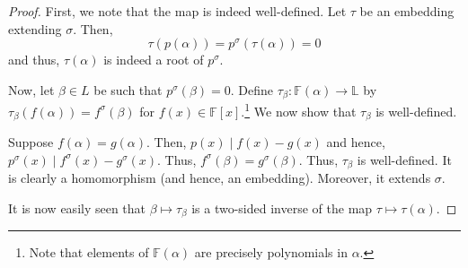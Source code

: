 \rootsandextensions*\label{prop:rootsandextensions2}
\begin{flushright}\hyperref[prop:rootsandextensions]{\upsym}\end{flushright}
\begin{proof}
    First, we note that the map is indeed well-defined. Let $\tau$ be an embedding extending $\sigma.$ Then,
    \begin{equation*} 
        \tau(p(\alpha)) = p^{\sigma}(\tau(\alpha)) = 0
    \end{equation*}
    and thus, $\tau(\alpha)$ is indeed a root of $p^{\sigma}.$ 

    Now, let $\beta \in L$ be such that $p^{\sigma}(\beta) = 0.$ Define $\tau_{\beta} : \mathbb{F}(\alpha) \to \mathbb{L}$ by $\tau_{\beta}(f(\alpha)) = f^{\sigma}(\beta)$ for $f(x) \in \mathbb{F}[x].$\footnote{Note that elements of $\mathbb{F}(\alpha)$ are precisely polynomials in $\alpha.$} We now show that $\tau_{\beta}$ is well-defined. 

    Suppose $f(\alpha) = g(\alpha).$ Then, $p(x) \mid f(x) - g(x)$ and hence, $p^{\sigma}(x) \mid f^{\sigma}(x) - g^{\sigma}(x).$ Thus, $f^{\sigma}(\beta) = g^{\sigma}(\beta).$ Thus, $\tau_{\beta}$ is well-defined. It is clearly a homomorphism (and hence, an embedding). Moreover, it extends $\sigma.$

    It is now easily seen that $\beta \mapsto \tau_{\beta}$ is a two-sided inverse of the map $\tau \mapsto \tau(\alpha).$
\end{proof}

